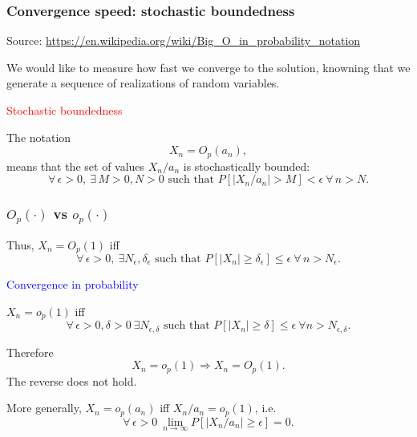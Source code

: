 \documentclass{beamer}
\begin{document}
\begin{frame}
\frametitle{Convergence speed: stochastic boundedness}

Source: \url{https://en.wikipedia.org/wiki/Big_O_in_probability_notation}

\mbox{}

We would like to measure how fast we converge to the solution, knowning that we generate a sequence of realizations of random variables.

\mbox{}

\textcolor{red}{Stochastic boundedness}

The notation
$$
X_{n}=O_{p}(a_{n}),
$$
means that the set of values $X_n/a_n$ is stochastically bounded:
$$
\forall\, \epsilon > 0,\ \exists\, M > 0, N > 0 \text{ such that } P[|X_{n}/a_{n}|>M ] < \epsilon \ \forall\, n > N.
$$

\end{frame}

\begin{frame}
\frametitle{$O_p(\cdot)$ vs $o_p(\cdot)$}

Thus, $X_n = O_p(1)$ iff
$$
\forall\, \epsilon > 0,\ \exists N_{\epsilon}, \delta_{\epsilon} \text{ such that } P[|X_{n} | \geq \delta_{\epsilon }] \leq \epsilon \ \forall\, n > N_{\epsilon}.
$$

\mbox{}

\textcolor{blue}{Convergence in probability}

$X_n = o_p(1)$ iff
$$
\forall\, \epsilon > 0, \delta > 0 \ \exists N_{\epsilon ,\delta } \text{ such that } P[|X_{n}|\geq \delta] \leq \epsilon \ \forall n > N_{\epsilon, \delta}.
$$

\mbox{}

Therefore
$$
X_n = o_p(1) \Rightarrow X_n = O_p(1).
$$
The reverse does not hold.

\mbox{}

More generally, $X_n = o_p(a_n)$ iff $X_n/{a_n} = o_p(1)$, i.e.
$$
\forall\, \epsilon > 0\ \lim_{n \rightarrow \infty} P[ |X_{n}/{a_n}| \geq \epsilon ] = 0.
$$

\end{frame}
\end{document}

